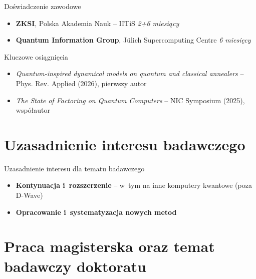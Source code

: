 \documentclass[aspectratio=169]{beamer}
\begin{document}
\begin{frame}{Doświadczenie zawodowe}
	\begin{itemize}
		\item \textbf{ZKSI}, Polska Akademia Nauk -- IITiS \hfill \textit{2+6 miesiący}
		\item \textbf{Quantum Information Group}, Jülich Supercomputing Centre \hfill \textit{6 miesięcy}
	\end{itemize}
	\vspace{0.6em}
	\begin{block}{Kluczowe osiągnięcia}
		\begin{itemize}
			\item \textit{Quantum-inspired dynamical models on quantum and classical annealers} -- Phys. Rev. Applied (2026), pierwszy autor
			\item \textit{The State of Factoring on Quantum Computers} -- NIC Symposium (2025), współautor
		\end{itemize}
	\end{block}
\end{frame}

\section{Uzasadnienie interesu badawczego}

\begin{frame}
\end{frame}

\begin{frame}{Uzasadnienie interesu dla tematu badawczego}
	\begin{itemize}
		\item \textbf{Kontynuacja i~rozszerzenie} -- w~tym na inne komputery kwantowe (poza D-Wave)
		\item \textbf{Opracowanie i~systematyzacja nowych metod}
	\end{itemize}
\end{frame}

\section{Praca magisterska oraz temat badawczy doktoratu}

\begin{frame}
\end{frame}
\end{document}
